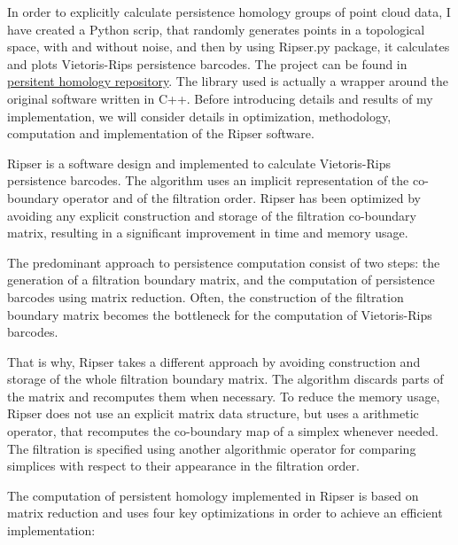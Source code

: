 \documentclass[11pt,a4paper]{report}
\begin{document}
            In order to explicitly calculate persistence homology groups of point cloud data, I have created a Python scrip, that randomly generates points in a topological space, with and without noise, and then by
            using Ripser.py package, it calculates and plots Vietoris-Rips persistence barcodes. The project can be found in 
            \href{https://github.com/kejjon/persistent_homology}{persitent homology repository}. The library used is actually a wrapper around the original software written in C++. Before introducing details and results of my implementation, we will consider details in optimization, methodology, computation and implementation of the Ripser software.

            Ripser is a software design and implemented to calculate Vietoris-Rips persistence barcodes. The algorithm uses
            an implicit representation of the co-boundary operator and of the filtration order. Ripser has been optimized by
            avoiding any explicit construction and storage of the filtration co-boundary matrix, resulting in a significant improvement in time and memory usage.

            The predominant approach to persistence computation consist of two steps: the generation of a filtration
            boundary matrix, and the computation of persistence barcodes using matrix reduction. Often, the construction of the filtration boundary matrix becomes
                the bottleneck for the computation of Vietoris-Rips barcodes.

            That is why, Ripser takes a different approach by avoiding construction and storage of the whole filtration boundary matrix. The algorithm discards parts of the matrix and recomputes them when necessary. To reduce the memory usage, Ripser does not use an explicit matrix data structure, but uses a arithmetic operator,
            that recomputes the co-boundary map of a simplex whenever needed. The filtration is specified using another algorithmic operator for
            comparing simplices with respect to their appearance in the filtration order.

            The computation of persistent homology implemented in Ripser is based on matrix reduction and uses four key
            optimizations in order to achieve an efficient implementation:
\end{document}
